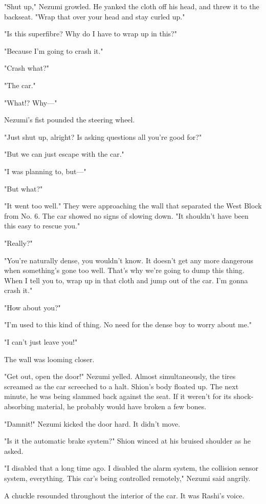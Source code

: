 "Shut up," Nezumi growled. He yanked the cloth off his head, and threw
it to the backseat. "Wrap that over your head and stay curled up."

"Is this superfibre? Why do I have to wrap up in this?"

"Because I'm going to crash it."

"Crash what?"

"The car."

"What!? Why---"

Nezumi's fist pounded the steering wheel.

"Just shut up, alright? Is asking questions all you're good for?"

"But we can just escape with the car."

"I was planning to, but---"

"But what?"

"It went too well." They were approaching the wall that separated the
West Block from No. 6. The car showed no signs of slowing down. "It
shouldn't have been this easy to rescue you."

"Really?"

"You're naturally dense, you wouldn't know. It doesn't get any more
dangerous when something's gone too well. That's why we're going to dump
this thing. When I tell you to, wrap up in that cloth and jump out of
the car. I'm gonna crash it."

"How about you?"

"I'm used to this kind of thing. No need for the dense boy to worry
about me."

"I can't just leave you!"

The wall was looming closer.

"Get out, open the door!" Nezumi yelled. Almost simultaneously, the
tires screamed as the car screeched to a halt. Shion's body floated up.
The next minute, he was being slammed back against the seat. If it
weren't for its shock-absorbing material, he probably would have broken
a few bones.

"Damnit!" Nezumi kicked the door hard. It didn't move.

"Is it the automatic brake system?" Shion winced at his bruised shoulder
as he asked.

"I disabled that a long time ago. I disabled the alarm system, the
collision sensor system, everything. This car's being controlled
remotely," Nezumi said angrily.

A chuckle resounded throughout the interior of the car. It was Rashi's
voice.

